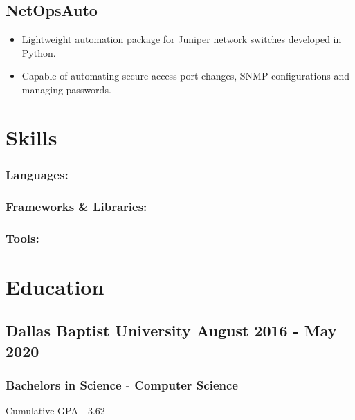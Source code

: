 \documentclass[letterpaper,10pt]{article}[leftmargin=*]
\def\mainsection#1{
  \section*{\Large{#1}}
}
\begin{document}
  \subsection*{NetOpsAuto}
  \begin{itemize}[leftmargin=.28cm, itemsep=1pt]
	  \item {Lightweight automation package for Juniper network switches developed in Python.}
	  \item {Capable of automating secure access port changes, SNMP configurations and managing passwords.}
  \end{itemize}

  \mainsection{Skills}
  \subsubsection*{Languages: }
  \subsubsection*{Frameworks \& Libraries: }
  \subsubsection*{Tools: }

  \mainsection{Education}
  \subsection*{Dallas Baptist University {\normalsize\normalfont\hfill {\faCalendar} \hspace{5pt}August 2016 - May 2020}}
  \subsubsection*{\normalfont Bachelors in Science - Computer Science } 
  Cumulative GPA - 3.62
\end{document}
